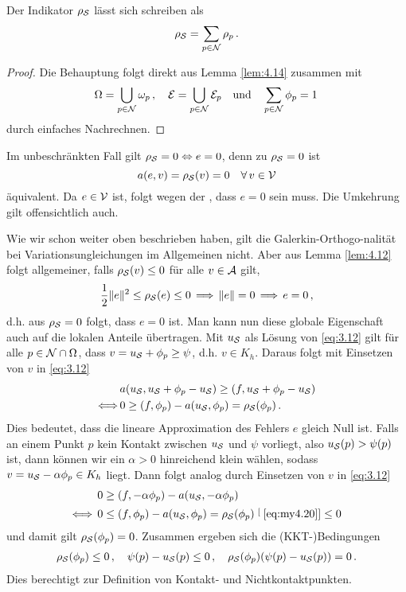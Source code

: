  
\begin{kor}\label{kor:4.15}
Der Indikator $\rho_{\mathcal S}$ lässt sich schreiben als
\begin{align}\label{eq:4.20}
	\rho_{\mathcal S} = \sum_{p \in \mathcal N} \rho_p \, .
\end{align}
\end{kor}

\begin{proof}
Die Behauptung folgt direkt aus Lemma \ref{lem:4.14} zusammen mit
\[
	\Omega = \bigcup_{p\in \mathcal N} \omega_p \, , \quad \mathcal E = \bigcup_{p \in \mathcal N} \mathcal E_p \quad \text{und}\quad \sum_{p \in \mathcal N} \phi_p = 1 \, 
\]
durch einfaches Nachrechnen.
\end{proof}


Im unbeschränkten Fall gilt $\rho_{\mathcal S} = 0 \Leftrightarrow e = 0$, denn zu $\rho_{\mathcal S} = 0$ ist 
\[
	a(e,v) = \rho_{\mathcal S}(v) = 0 \quad \forall \, v \in \mathcal V
\]
äquivalent. Da $e\in \mathcal V$ ist, folgt wegen der , dass $e=0$ sein muss. Die Umkehrung gilt offensichtlich auch.

Wie wir schon weiter oben beschrieben haben, gilt die Galerkin-Orthogo-nalität bei Variationsungleichungen  im Allgemeinen nicht. Aber aus Lemma \ref{lem:4.12} folgt allgemeiner, falls $\rho_{\mathcal S} (v) \le 0$ für alle $v \in \mathcal A$ gilt,
\[
	\frac 12 \lVert e\rVert^2 \le \rho_{\mathcal S}(e) \le 0\,  \Longrightarrow\,  \lVert e\rVert = 0 \, \Longrightarrow\, e = 0 \, ,
\]
d.h. aus $\rho_{\mathcal S} = 0$ folgt, dass $e = 0$ ist. Man kann nun diese globale Eigenschaft auch auf die lokalen Anteile übertragen. Mit $u_{\mathcal S}$ als Lösung von \eqref{eq:3.12} gilt für alle $p \in \mathcal N \cap \Omega$, dass $v = u_{\mathcal S} + \phi_p  \ge \psi$, d.h. $v \in K_h$. Daraus folgt mit Einsetzen von $v$ in  \eqref{eq:3.12}
\begin{align}\notag
	&a(u_{\mathcal S}, u_{\mathcal S} + \phi_p - u_{\mathcal S}) \ge (f,u_{\mathcal S}+\phi_p-u_{\mathcal S}) \\
	\label{eq:my4.20}
	\Longleftrightarrow \,  & 0 \ge (f,\phi_p)-a(u_{\mathcal S},\phi_p) = \rho_{\mathcal S}(\phi_p) \, .
\end{align}
Dies bedeutet, dass die lineare Approximation des Fehlers $e$ gleich Null ist. Falls an einem Punkt $p$ kein Kontakt zwischen $u_{\mathcal S}$ und $\psi$ vorliegt, also $u_{\mathcal S} (p) > \psi(p)$ ist, dann können wir ein $\alpha > 0$ hinreichend klein wählen, sodass $v = u_{\mathcal S} - \alpha \phi_p \in K_h$ liegt. Dann folgt analog durch Einsetzen von $v$ in \eqref{eq:3.12}
\begin{align*}
	0 & \ge (f,-\alpha \phi_p) - a(u_{\mathcal S},-\alpha\phi_p) \\
	\Longleftrightarrow \, 0 & \le (f,\phi_p) - a(u_{\mathcal S},\phi_p) = \rho_{\mathcal S} (\phi_p) \stackrel[\scriptsize\eqref{eq:my4.20}]{}\le 0
\end{align*}
und damit gilt $\rho_{\mathcal S} (\phi_p) = 0$.  Zusammen ergeben sich die (KKT-)Bedingungen
\begin{align}\label{eq:4.21}
	\rho_{\mathcal S} (\phi_p) \le 0 \, , \quad \psi(p)-u_{\mathcal S} (p) \le 0 \, , \quad \rho_{\mathcal S} (\phi_p) (\psi(p)-u_{\mathcal S} (p)) = 0 \, .
\end{align}
Dies berechtigt zur Definition von Kontakt- und Nichtkontaktpunkten.


